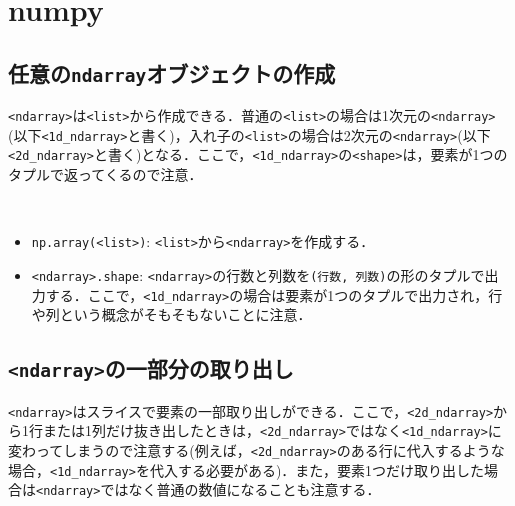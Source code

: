 \section{numpy}

\subsection{任意の\texttt{ndarray}オブジェクトの作成}

\texttt{<ndarray>}は\texttt{<list>}から作成できる．普通の\texttt{<list>}の場合は1次元の\texttt{<ndarray>}(以下\texttt{<1d\_ndarray>}と書く)，入れ子の\texttt{<list>}の場合は2次元の\texttt{<ndarray>}(以下\texttt{<2d\_ndarray>}と書く)となる．ここで，\texttt{<1d\_ndarray>}の\texttt{<shape>}は，要素が1つのタプルで返ってくるので注意．

\begin{gram}　
\begin{itemize}
\item \texttt{np.array(<list>)}: \texttt{<list>}から\texttt{<ndarray>}を作成する．
\item \texttt{<ndarray>.shape}: \texttt{<ndarray>}の行数と列数を\texttt{(行数, 列数)}の形のタプルで出力する．ここで，\texttt{<1d\_ndarray>}の場合は要素が1つのタプルで出力され，行や列という概念がそもそもないことに注意．

\end{itemize}
\end{gram}

\begin{cod}[\texttt{num1.py}]　
}]{code/num1.py}
\vspace{-7pt}
\begin{lstlisting}
array_1d=
[1 3 5 9]
shape=(4,)
type=<class 'numpy.ndarray'>

array_2d=
[[ 1  3  5]
 [ 2  4  6]
 [ 3  6  9]
 [ 5 10 15]]
shape=(4, 3)
type=<class 'numpy.ndarray'>
\end{lstlisting}
\end{cod}
\vspace{-10pt}

\subsection{\texttt{<ndarray>}の一部分の取り出し}

\texttt{<ndarray>}はスライスで要素の一部取り出しができる．ここで，\texttt{<2d\_ndarray>}から1行または1列だけ抜き出したときは，\texttt{<2d\_ndarray>}ではなく\texttt{<1d\_ndarray>}に変わってしまうので注意する(例えば，\texttt{<2d\_ndarray>}のある行に代入するような場合，\texttt{<1d\_ndarray>}を代入する必要がある)．また，要素1つだけ取り出した場合は\texttt{<ndarray>}ではなく普通の数値になることも注意する．

